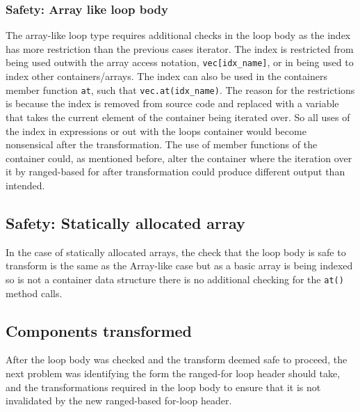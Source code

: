 \documentclass[bsc,frontabs,singlespacing,twoside,parskip,deptreport]{infthesis}
\begin{document}
\subsubsection{Safety: Array like loop body}

The array-like loop type requires additional checks in the loop body as the index has more restriction than the previous cases iterator. The index is restricted from being used outwith the array access notation, \texttt{vec[idx\_name]}, or in being used to index other containers/arrays. The index can also  be used in the containers member function \texttt{at}, such that \texttt{vec.at(idx\_name)}. The reason for the restrictions is because the index is removed from source code and replaced with a variable that takes the current element of the container being iterated over. So all uses of the index in expressions or out with the loops container would become nonsensical after the transformation. The use of member functions of the container could, as mentioned before, alter the container where the iteration over it by ranged-based for after transformation could produce different output than intended. 

\subsection{Safety: Statically allocated array }

In the case of statically allocated arrays, the check that the loop body is safe to transform is the same as the Array-like case but as a basic array is being indexed so is not a container data structure there is no additional checking for the \texttt{at()} method calls.  



\subsection{Components transformed}
After the loop body was checked and the transform deemed safe to proceed, the next problem was identifying the form the ranged-for loop header should take, and the transformations required in the loop body to ensure that it is not invalidated by the new ranged-based for-loop header.
\end{document}
